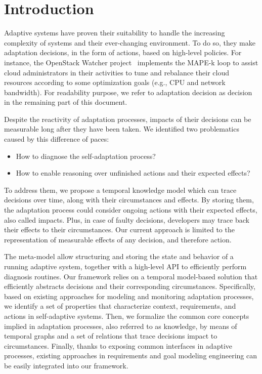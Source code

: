 \section{Introduction}


Adaptive systems have proven their suitability to handle the increasing complexity of systems and their ever-changing environment.
To do so, they make adaptation decisions, in the form of actions, based on high-level policies. 
For instance, the OpenStack Watcher project~\cite{OpenStack:Watcher:Wiki} implements the MAPE-k loop to assist cloud administrators in their activities to tune and rebalance their cloud resources according to some optimization goals (e.g., CPU and network bandwidth). 
For readability purpose, we refer to adaptation decision as decision in the remaining part of this document.

Despite the reactivity of adaptation processes, impacts of their decisions can be measurable long after they have been taken.
We identified two problematics caused by this difference of paces:
\begin{itemize}
	\item How to diagnose the self-adaptation process?
	\item How to enable reasoning over unfinished actions and their expected effects?
\end{itemize}

To address them, we propose a temporal knowledge model which can trace decisions over time, along with their circumstances and effects.
By storing them, the adaptation process could consider ongoing actions with their expected effects, also called impacts.
Plus, in case of faulty decisions, developers may trace back their effects to their circumstances.
Our current approach is limited to the representation of measurable effects of any decision, and therefore action.

The meta-model allow structuring and storing the state and behavior of a running adaptive system, together with a high-level API to efficiently perform diagnosis routines. 
Our framework relies on a temporal model-based solution that efficiently abstracts decisions and their corresponding circumstances.
Specifically, based on existing approaches for modeling and monitoring adaptation processes, we identify a set of properties that characterize context, requirements, and actions in self-adaptive systems.    
Then, we formalize the common core concepts implied in adaptation processes, also referred to as knowledge, by means of temporal graphs and a set of relations that trace decisions impact to circumstances.
Finally, thanks to exposing common interfaces in adaptive processes, existing approaches in requirements and goal modeling engineering can be easily integrated into our framework. 

